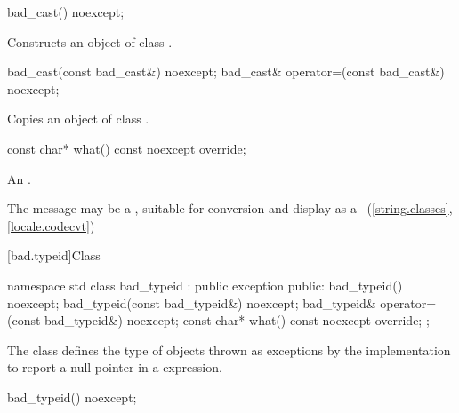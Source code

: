 %
\begin{itemdecl}
bad_cast() noexcept;
\end{itemdecl}

\begin{itemdescr}
\pnum
\effects
Constructs an object of class
.
\end{itemdescr}

%
%
\begin{itemdecl}
bad_cast(const bad_cast&) noexcept;
bad_cast& operator=(const bad_cast&) noexcept;
\end{itemdecl}

\begin{itemdescr}
\pnum
\effects
Copies an object of class
.
\end{itemdescr}

%
\begin{itemdecl}
const char* what() const noexcept override;
\end{itemdecl}

\begin{itemdescr}
\pnum
\returns
An  \ntbs{}.

\pnum
\remarks
The message may be a
,
suitable for conversion and display as a
~(\ref{string.classes}, \ref{locale.codecvt})
\end{itemdescr}

[bad.typeid]{Class }

%
\begin{codeblock}
namespace std {
  class bad_typeid : public exception {
  public:
    bad_typeid() noexcept;
    bad_typeid(const bad_typeid&) noexcept;
    bad_typeid& operator=(const bad_typeid&) noexcept;
    const char* what() const noexcept override;
  };
}
\end{codeblock}

\pnum
The class
defines the type of objects
thrown as exceptions by the implementation to report a null pointer
in a
expression.

%
\begin{itemdecl}
bad_typeid() noexcept;
\end{itemdecl}

